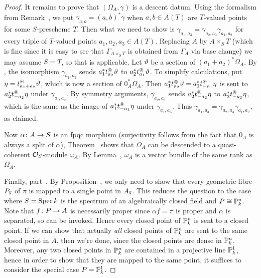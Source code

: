 \documentclass[a4paper,parskip=half,numbers=enddot, DIV=12]{scrreprt}
\begin{document}
\begin{proof}
	It remains to prove that $(\Omega_A,\gamma)$ is a descent datum. Using the formalism from Remark~, we put $\gamma_{a,b}=(a,b)^*\gamma$ when $a,b\in A(T)$ are $T$-valued points for some $S$-prescheme $T$. Then what we need to show is $\gamma_{a_1,a_3}=\gamma_{a_2,a_3}\gamma_{a_1,a_2}$ for every triple of $T$-valued points $a_1,a_2,a_3\in A(T)$. Replacing $A$ by $A\times_ST$ (which is fine since it is easy to see that $\Gamma_{A\times_ST}$ is obtained from $\Gamma_A$ via base change) we may assume $S=T$, so that  is applicable. Let $\vartheta$ be a section of $(a_1+a_2)^*\Omega_A$. By , the isomorphism $\gamma_{a_1,a_2}$ sends $a_1^*t_{a_2}^\oast\vartheta$ to $a_2^*t_{a_1}^\oast\vartheta$. To simplify calculations, put $\eta=t_{a_1+a_2}^\oast\vartheta$, which is now a section of $0_A^*\Omega_A$. Then $a_1^*t_{a_2}^\oast\vartheta=a_1^*t_{-a_1}^\oast\eta$ is sent to $a_2^*t_{-a_2}^\oast\eta$ under $\gamma_{a_1,a_2}$. By symmetry arguments, $\gamma_{a_2,a_3}$ sends $a_2^*t_{-a_2}^\oast\eta$ to $a_3^*t_{-a_3}^\oast\eta$, which is the same as the image of $a_1^*t_{-a_1}^\oast\eta$ under $\gamma_{a_1,a_3}$. Thus $\gamma_{a_1,a_3}=\gamma_{a_2,a_3}\gamma_{a_1,a_2}$, as claimed.
	
	Now $\alpha\colon A\morphism S$ is an fpqc morphism (surjectivity follows from the fact that $0_A$ is always a split of $\alpha$), Theorem~ shows that $\Omega_A$ can be descended to a quasi-coherent $\mathcal{O}_S$-module $\omega_A$. By Lemma~, $\omega_A$ is a vector bundle of the same rank as $\Omega_A$.
	
	Finally, part~. By Proposition~, we only need to show that every geometric fibre $P_{\overline{s}}$ of $\pi$ is mapped to a single point in $A_{\overline{s}}$. This reduces the question to the case where $S=\operatorname{Spec} k$ is the spectrum of an algebraically closed field and $P\cong\mathbb{P}_k^n$. Note that $f\colon P\morphism A$ is necessarily proper since $\alpha f=\pi$ is proper and $\alpha$ is separated, so \cite[Proposition~2.4.1]{alggeo2} can be invoked. Hence every closed point of $\mathbb{P}_k^n$ is sent to a closed point. If we can show that actually \emph{all} closed points of $\mathbb{P}_k^n$ are sent to the same closed point in $A$, then we're done, since the closed points are dense in $\mathbb{P}_k^n$. Moreover, any two closed points in $\mathbb{P}_k^n$ are contained in a projective line $\mathbb{P}_k^1$, hence in order to show that they are mapped to the same point, it suffices to consider the special case $P=\mathbb{P}_k^1$.
	

\end{proof}
\end{document}
